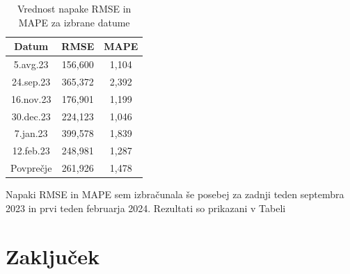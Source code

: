 \documentclass[a4paper, 11pt]{article}
\begin{document}
\begin{table}[!ht]
    \centering
    \caption{Vrednost napake RMSE in MAPE za izbrane datume}\par\medskip
    \label{Tab:RMSE_MAPE}
    \begin{tabular}{c|c|c}
        Datum & RMSE & MAPE \\ \hline
        5.avg.23 & 156,600 & 1,104 \\ 
        24.sep.23 & 365,372 & 2,392 \\ 
        16.nov.23 & 176,901 & 1,199 \\ 
        30.dec.23 & 224,123 & 1,046 \\ 
        7.jan.23 & 399,578 & 1,839 \\ 
        12.feb.23 & 248,981 & 1,287 \\ \hline
        Povprečje & 261,926 & 1,478 \\ 
    \end{tabular}
\end{table}


\noindent Napaki RMSE in MAPE sem izbračunala še posebej za zadnji teden septembra 2023 in 
prvi teden februarja 2024. Rezultati so prikazani v Tabeli 






\pagebreak

\section{Zaključek}




\pagebreak



\end{document}
